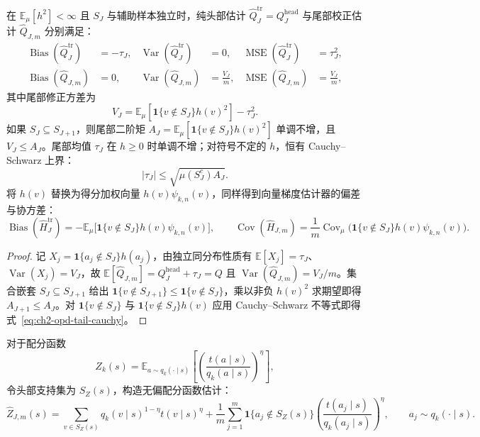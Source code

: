\documentclass[lang=cn,scheme=chinese,openany]{elegantbook}
\newcommand{\E}{\mathbb E}
\newcommand{\Var}{\operatorname{Var}}
\begin{document}
\begin{theorem}
\label{thm:ch2-opd-topk-bias-variance}
在 $\mathbb E_\mu[h^2]<\infty$ 且 $S_J$ 与辅助样本独立时，纯头部估计 $\widehat Q_J^{\mathrm{tr}}=Q_J^{\mathrm{head}}$ 与尾部校正估计 $\widehat Q_{J,m}$ 分别满足：
\begin{align}
\operatorname{Bias}(\widehat Q_J^{\mathrm{tr}})&=-\tau_J,&
\operatorname{Var}(\widehat Q_J^{\mathrm{tr}})&=0,&
\operatorname{MSE}(\widehat Q_J^{\mathrm{tr}})&=\tau_J^2,\\
\operatorname{Bias}(\widehat Q_{J,m})&=0,&
\operatorname{Var}(\widehat Q_{J,m})&=\frac{V_J}{m},&
\operatorname{MSE}(\widehat Q_{J,m})&=\frac{V_J}{m},
\end{align}
其中尾部修正方差为
\begin{equation}
V_J=\mathbb E_\mu\left[\mathbf 1\{v\notin S_J\}h(v)^2\right]-\tau_J^2.
\label{eq:ch2-opd-tail-variance}
\end{equation}
如果 $S_J\subseteq S_{J+1}$，则尾部二阶矩 $A_J=\mathbb E_\mu[\mathbf 1\{v\notin S_J\}h(v)^2]$ 单调不增，且 $V_J\le A_J$。尾部均值 $\tau_J$ 在 $h\ge0$ 时单调不增；对符号不定的 $h$，恒有 Cauchy--Schwarz 上界：
\begin{equation}
|\tau_J|\le \sqrt{\mu(S_J^c)A_J}.
\label{eq:ch2-opd-tail-cauchy}
\end{equation}
将 $h(v)$ 替换为得分加权向量 $h(v)\psi_{k,n}(v)$，同样得到向量梯度估计器的偏差与协方差：
\begin{equation}
\operatorname{Bias}(\widehat H_J^{\mathrm{tr}})
 =-\mathbb E_\mu\bigl[\mathbf 1\{v\notin S_J\}h(v)\psi_{k,n}(v)\bigr],
\qquad
\operatorname{Cov}(\widehat H_{J,m})
 =\frac1m\operatorname{Cov}_\mu\bigl(\mathbf 1\{v\notin S_J\}h(v)\psi_{k,n}(v)\bigr).
\label{eq:ch2-opd-gradient-topk-mse}
\end{equation}
\end{theorem}
\begin{proof}
记 $X_j=\mathbf1\{a_j\notin S_J\}h(a_j)$，由独立同分布性质有 $\E[X_j]=\tau_J$、$\Var(X_j)=V_J$，故 $\E[\widehat Q_{J,m}]=Q_J^{\mathrm{head}}+\tau_J=Q$ 且 $\Var(\widehat Q_{J,m})=V_J/m$。集合嵌套 $S_J\subseteq S_{J+1}$ 给出 $\mathbf1\{v\notin S_{J+1}\}\le\mathbf1\{v\notin S_J\}$，乘以非负 $h(v)^2$ 求期望即得 $A_{J+1}\le A_J$。对 $\mathbf1\{v\notin S_J\}$ 与 $\mathbf1\{v\notin S_J\}h(v)$ 应用 Cauchy--Schwarz 不等式即得式~\eqref{eq:ch2-opd-tail-cauchy}。
\end{proof}

对于配分函数
\begin{equation}
Z_k(s)=\mathbb E_{a\sim q_k(\cdot\mid s)}
\left[\left(\frac{t(a\mid s)}{q_k(a\mid s)}\right)^\eta\right],
\label{eq:ch2-opd-z-importance}
\end{equation}
令头部支持集为 $S_Z(s)$，构造无偏配分函数估计：
\begin{equation}
\widehat Z_{J,m}(s)
=\sum_{v\in S_Z(s)}q_k(v\mid s)^{1-\eta}t(v\mid s)^\eta
+\frac1m\sum_{j=1}^{m}\mathbf 1\{a_j\notin S_Z(s)\}
\left(\frac{t(a_j\mid s)}{q_k(a_j\mid s)}\right)^\eta,
\qquad a_j\sim q_k(\cdot\mid s).
\label{eq:ch2-opd-topk-z}
\end{equation}
\end{document}
